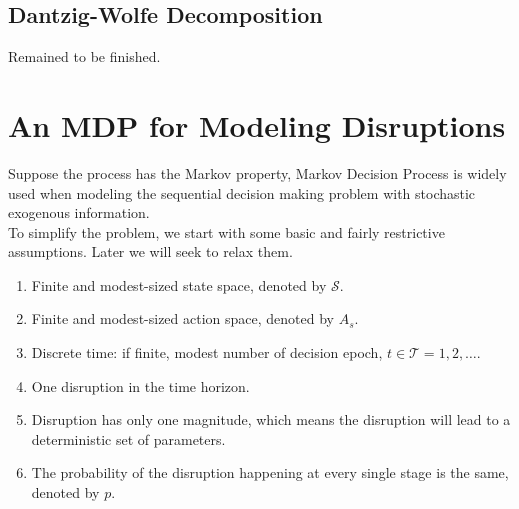 \documentclass[11pt]{article}
\begin{document}
	\subsection{Dantzig-Wolfe Decomposition}
	Remained to be finished.


\section{An MDP for Modeling Disruptions}
		Suppose the process has the Markov property, Markov Decision Process is widely used when modeling the sequential decision making problem with stochastic exogenous information.\\
	\newline To simplify the problem, we start with some basic and fairly restrictive assumptions. Later we will seek to relax them.
	\begin{enumerate}
		\item Finite and modest-sized state space, denoted by \(\mathscr{S}\).
		\item Finite and modest-sized action space, denoted by \(A_s\).
		\item Discrete time: if finite, modest number of decision epoch, \(t \in \mathscr{T}={1,2,\dots}\).
		\item One disruption in the time horizon.
		\item Disruption has only one magnitude, which means the disruption will lead to a deterministic set of parameters. 
		\item The probability of the disruption happening at every single stage is the same, denoted by \(p\).
	\end{enumerate}
\end{document}

